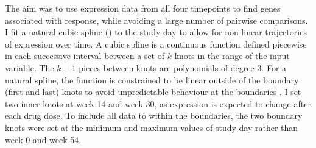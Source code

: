 
The aim was to use expression data from all four timepoints to find genes associated with response,
while avoiding a large number of pairwise comparisons.
I fit a natural cubic spline () to the study day to allow for non-linear trajectories of expression over time.
A cubic spline is a continuous function defined piecewise in each successive interval between a set of $k$ knots in the range of the input variable.
The $k-1$ pieces between knots are polynomials of degree 3. 
For a natural spline, the function is constrained to be linear outside of the boundary (first and last) knots to avoid unpredictable behaviour at the boundaries \autocite{perperoglou2019ReviewSplineFunction}.
%
%
I set two inner knots at week 14 and week 30, as expression is expected to change after each drug dose.
To include all data to within the boundaries, the two boundary knots were set at the minimum and maximum values of study day rather than week 0 and week 54.
